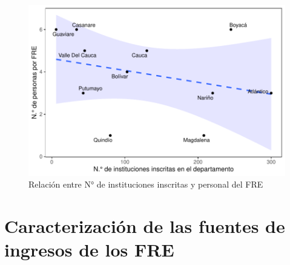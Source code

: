 \documentclass[
]{book}
\begin{document}
\begin{figure}
\includegraphics[width=0.85\linewidth]{InformeFinal_files/figure-latex/institucionesInscritasRelacion-1} \caption{Relación entre N° de instituciones inscritas y personal del FRE}\label{fig:institucionesInscritasRelacion}
\end{figure}

\hypertarget{caracterizaciuxf3n-de-las-fuentes-de-ingresos-de-los-fre}{%
\section{Caracterización de las fuentes de ingresos de los FRE}\label{caracterizaciuxf3n-de-las-fuentes-de-ingresos-de-los-fre}}
\end{document}
